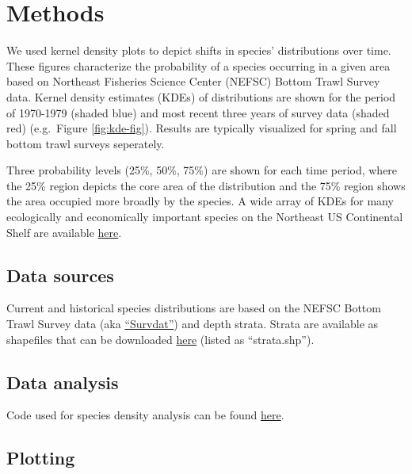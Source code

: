 \documentclass[
]{book}
\begin{document}
\hypertarget{methods-38}{%
\section{Methods}\label{methods-38}}

We used kernel density plots to depict shifts in species' distributions over time. These figures characterize the probability of a species occurring in a given area based on Northeast Fisheries Science Center (NEFSC) Bottom Trawl Survey data. Kernel density estimates (KDEs) of distributions are shown for the period of 1970-1979 (shaded blue) and most recent three years of survey data (shaded red) (e.g.~Figure \ref{fig:kde-fig}). Results are typically visualized for spring and fall bottom trawl surveys seperately.

Three probability levels (25\%, 50\%, 75\%) are shown for each time period, where the 25\% region depicts the core area of the distribution and the 75\% region shows the area occupied more broadly by the species. A wide array of KDEs for many ecologically and economically important species on the Northeast US Continental Shelf are available \href{https://www.nefsc.noaa.gov/ecosys/current-conditions/kernel-density.html}{here}.

\hypertarget{data-sources-38}{%
\subsection{Data sources}\label{data-sources-38}}

Current and historical species distributions are based on the NEFSC Bottom Trawl Survey data (aka \protect\hyperlink{survdat}{``Survdat''}) and depth strata. Strata are available as shapefiles that can be downloaded \href{https://github.com/NOAA-EDAB/tech-doc/tree/master/gis}{here} (listed as
``strata.shp'').

\hypertarget{data-analysis-36}{%
\subsection{Data analysis}\label{data-analysis-36}}

Code used for species density analysis can be found \href{https://github.com/NOAA-EDAB/tech-doc/blob/master/R/stored_scripts/species_density_analysis.R}{here}.

\hypertarget{plotting-30}{%
\subsection{Plotting}\label{plotting-30}}
\end{document}

